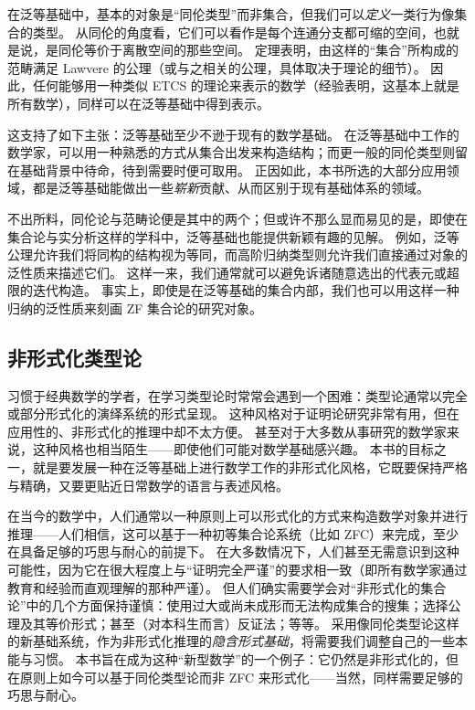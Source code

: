 在泛等基础中，基本的对象是``同伦类型''而非集合，但我们可以\emph{定义}一类行为像集合的类型。
从同伦的角度看，它们可以看作是每个连通分支都可缩的空间，也就是说，是同伦等价于离散空间的那些空间。
%
定理表明，由这样的``集合''所构成的范畴满足 Lawvere 的公理（或与之相关的公理，具体取决于理论的细节）。
因此，任何能够用一种类似 ETCS 的理论来表示的数学（经验表明，这基本上就是所有数学），同样可以在泛等基础中得到表示。

这支持了如下主张：泛等基础至少不逊于现有的数学基础。
在泛等基础中工作的数学家，可以用一种熟悉的方式从集合出发来构造结构；而更一般的同伦类型则留在基础背景中待命，待到需要时便可取用。
正因如此，本书所选的大部分应用领域，都是泛等基础能做出一些\emph{崭新}贡献、从而区别于现有基础体系的领域。

不出所料，同伦论与范畴论便是其中的两个；但或许不那么显而易见的是，即使在集合论与实分析这样的学科中，泛等基础也能提供新颖有趣的见解。
例如，泛等公理允许我们将同构的结构视为等同，而高阶归纳类型则允许我们直接通过对象的泛性质来描述它们。
这样一来，我们通常就可以避免诉诸随意选出的代表元或超限的迭代构造。
事实上，即使是在泛等基础的集合内部，我们也可以用这样一种归纳的泛性质来刻画 ZF 集合论的研究对象。

%

\subsection*{非形式化类型论}

%
%
%
%
习惯于经典数学的学者，在学习类型论时常常会遇到一个困难：类型论通常以完全或部分形式化的演绎系统的形式呈现。
这种风格对于证明论研究非常有用，但在应用性的、非形式化的推理中却不太方便。
甚至对于大多数从事研究的数学家来说，这种风格也相当陌生——即使他们可能对数学基础感兴趣。
本书的目标之一，就是要发展一种在泛等基础上进行数学工作的非形式化风格，它既要保持严格与精确，又要更贴近日常数学的语言与表述风格。

在当今的数学中，人们通常以一种原则上可以形式化的方式来构造数学对象并进行推理——人们相信，这可以基于一种初等集合论系统（比如 ZFC）来完成，至少在具备足够的巧思与耐心的前提下。
在大多数情况下，人们甚至无需意识到这种可能性，因为它在很大程度上与``证明完全严谨''的要求相一致（即所有数学家通过教育和经验而直观理解的那种严谨）。
但人们确实需要学会对``非形式化的集合论''中的几个方面保持谨慎：使用过大或尚未成形而无法构成集合的搜集；选择公理及其等价形式；甚至（对本科生而言）反证法；等等。
采用像同伦类型论这样的新基础系统，作为非形式化推理的\emph{隐含形式基础}，将需要我们调整自己的一些本能与习惯。
本书旨在成为这种``新型数学''的一个例子：它仍然是非形式化的，但在原则上如今可以基于同伦类型论而非 ZFC 来形式化——当然，同样需要足够的巧思与耐心。

